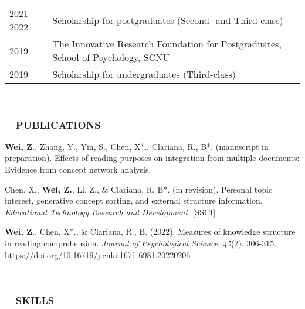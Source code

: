 \documentclass[a4paper, 12pt]{article}
\begin{document}
\begin{tabularx}{\textwidth}{p{2cm} X}

    2021-2022 & Scholarship for postgraduates (Second- and Third-class)\\

    2019 & The Innovative Research Foundation for Postgraduates, School of Psychology, SCNU \\
    
    2019 & Scholarship for undergraduates (Third-class)
    
\end{tabularx}

\  \par


\subsubsection*{ \ \ PUBLICATIONS}

\begin{description}
    
    \item \textbf{Wei, Z.}, Zhang, Y., Yin, S., Chen, X*., Clariana, R., B*. (manuscript in preparation). Effects of reading purposes on integration from multiple documents: Evidence from concept network analysis.

    \item Chen, X., \textbf{Wei, Z.}, Li, Z., \& Clariana, R. B*. (in revision). Personal topic interest, generative concept sorting, and external structure information. \textit{Educational Technology Research and Development}. [SSCI]

    \item \textbf{Wei, Z.}, Chen, X*., \& Clariana, R., B. (2022). Measures of knowledge structure in reading comprehension. \textit{Journal of Psychological Science}, \textit{45}(2), 306-315. \href{https://doi.org/10.16719/j.cnki.1671-6981.20220206}{https://doi.org/10.16719/j.cnki.1671-6981.20220206}

    
    \end{description}

\  \par


\subsubsection*{ \ \ SKILLS}
\end{document}
